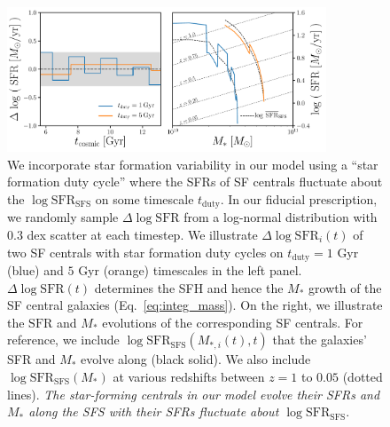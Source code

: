 \documentclass[12pt, letterpaper, preprint, tighten]{aastex62}
\newcommand{\logsfr}{\log\mathrm{SFR}}
\newcommand{\logsfrsfs}{\log\mathrm{SFR}_\mathrm{SFS}}
\begin{document}
\begin{figure}
\begin{center}
\includegraphics[width=0.85\textwidth]{figs/sfh_pedagogical.pdf}
    \caption{We incorporate star formation variability in our model using a 
    ``star formation duty cycle'' where the SFRs of SF centrals fluctuate about 
    the $\logsfrsfs$ on some timescale $t_\mathrm{duty}$. In our fiducial 
    prescription, we randomly sample $\Delta \logsfr$ from a log-normal 
    distribution with $0.3$ dex scatter at each timestep. We illustrate 
    $\Delta\logsfr_i(t)$ of two SF centrals with star formation duty cycles 
    on $t_\mathrm{duty} = 1$ Gyr (blue) and $5$ Gyr (orange) timescales 
    in the left panel. $\Delta \logsfr(t)$ determines the SFH and hence 
    the $M_*$ growth of the SF central galaxies (Eq.~\ref{eq:integ_mass}).  
    On the right, we illustrate the $\mathrm{SFR}$ and $M_*$ evolutions 
    of the corresponding SF centrals. For reference, we include 
    $\logsfrsfs(M_{*,i}(t), t)$ that the galaxies' SFR and $M_*$ evolve along 
    (black solid). We also include $\logsfrsfs(M_*)$ at various redshifts 
    between $z = 1$ to $0.05$ (dotted  lines). \emph{The star-forming 
    centrals in our model evolve their SFRs and $M_*$ along the SFS 
    with their SFRs fluctuate about $\logsfrsfs$}.} \label{fig:sfh_model}
\end{center}
\end{figure}
\end{document}
